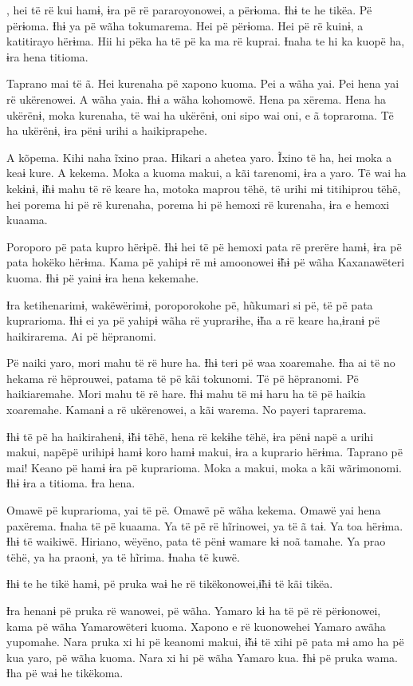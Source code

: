 , hei të rë kui hamɨ, ɨra pë rë pararoyonowei, a përɨoma. Ɨhɨ te
he tikëa. Pë përɨoma. Ɨhɨ ya pë wãha tokumarema. Hei pë përɨoma. Hei pë
rë kuinɨ, a katitirayo hërɨma. Hii hi pëka ha të pë ka ma rë kuprai.
Ɨnaha te hi ka kuopë ha, ɨra hena titioma. 

Taprano mai të ã. Hei kurenaha pë xapono kuoma. Pei a wãha yai. Pei hena
yai rë ukërenowei. A wãha yaia. Ɨhɨ a wãha kohomowë. Hena pa xërema.
Hena ha ukërënɨ, moka kurenaha, të wai ha ukërënɨ, oni sipo wai oni, e ã
topraroma. Të ha ukërënɨ, ɨra pënɨ urihi a haikiprapehe. 

A kõpema. Kihi naha ĩxino praa. Hikari a ahetea yaro. Ĩxino të ha, hei
moka a keaɨ kure. A kekema. Moka a kuoma makui, a kãi tarenomi, ɨra a
yaro. Të wai ha kekɨnɨ, ɨ̃hɨ mahu të rë keare ha, motoka maprou tëhë, të
urihi mɨ titihiprou tëhë, hei porema hi pë rë kurenaha, porema hi pë
hemoxi rë kurenaha, ɨra e hemoxi kuaama. 

Poroporo pë pata kupro hërɨpë. Ɨhɨ hei të pë hemoxi pata rë prerëre
hamɨ, ɨra pë pata hokëko hërɨma. Kama pë yahipɨ rë mɨ amoonowei ɨ̃hɨ pë
wãha Kaxanawëteri kuoma. Ɨhɨ pë yainɨ ɨra hena kekemahe. 

Ɨra ketihenarimɨ, wakëwërimɨ, poroporokohe pë, hũkumari si pë, të pë
pata kuprarioma. Ɨhɨ ei ya pë yahipɨ wãha rë yuprarɨhe, ɨ̃ha a rë keare
ha,ɨranɨ pë haikirarema. Ai pë hëpranomi. 

Pë naiki yaro, mori mahu të rë hure ha. Ɨhɨ teri pë waa xoaremahe. Ɨha
ai të no hekama rë hëprouwei, patama të pë kãi tokunomi. Të pë
hëpranomi. Pë haikiaremahe. Mori mahu të rë hare. Ɨhɨ mahu të mɨ haru ha
të pë haikia xoaremahe. Kamanɨ a rë ukërenowei, a kãi warema. No payeri
taprarema. 

Ɨhɨ të pë ha haikirahenɨ, ɨ̃hɨ tëhë, hena rë kekɨhe tëhë, ɨra pënɨ napë a
urihi makui, napëpë urihipɨ hamɨ koro hamɨ makui, ɨra a kuprario hërɨma.
Taprano pë mai! Keano pë hamɨ ɨra pë kuprarioma. Moka a makui, moka a
kãi wãrimonomi. Ɨhɨ ɨra a titioma. Ɨra hena. 

Omawë pë kuprarioma, yai të pë. Omawë pë wãha kekema. Omawë yai hena
paxërema. Ɨnaha të pë kuaama. Ya të pë rë hĩrinowei, ya të ã taɨ. Ya toa
hërɨma. Ɨhɨ të waikiwë. Hiriano, wëyëno, pata të pënɨ wamare kɨ noã
tamahe. Ya prao tëhë, ya ha praonɨ, ya të hĩrima. Ɨnaha të kuwë. 

Ɨhɨ te he tikë hamɨ, pë pruka waɨ he rë tikëkonowei,ɨ̃hɨ të kãi tikëa. 

Ɨra henanɨ pë pruka rë wanowei, pë wãha. Yamaro kɨ ha të pë rë
përɨonowei, kama pë wãha Yamarowëteri kuoma. Xapono e rë kuonowehei
Yamaro awãha yupomahe. Nara pruka xi hi pë keanomi makui, ɨ̃hɨ të xihi pë
pata mɨ amo ha pë kua yaro, pë wãha kuoma. Nara xi hi pë wãha Yamaro
kua. Ɨhɨ pë pruka wama. Ɨha pë waɨ he tikëkoma. 

